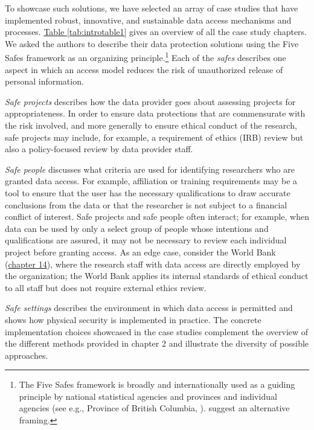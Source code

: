 To showcase such solutions, we have selected an array of case studies that have implemented robust, innovative, and sustainable data access mechanisms and processes. \href{https://drive.google.com/file/d/11QOJs0fXgLJp9W74SpWCti2_glpmonHC/view?usp=sharing}{Table \ref{tab:introtable1}} gives an overview of all the case study chapters. We asked the authors to describe their data protection solutions using the Five Safes framework \citep{desai2016} as an organizing principle.\footnote{The Five Safes framework is broadly and internationally used as a guiding principle by national statistical agencies \citep{australianbureauofstatistics2017, statisticscanada2018} and provinces and individual agencies (see e.g., Province of British Columbia, \citet{bcministryofcitizensservices}). \citet{altman2015} suggest an alternative framing.} Each of the \emph{safes} describes one aspect in which an access model reduces the risk of unauthorized release of personal information.



\emph{Safe projects} describes how the data provider goes about assessing projects for appropriateness. In order to ensure data protections that are commensurate with the risk involved, and more generally to ensure ethical conduct of the research, safe projects may include, for example, a requirement of ethics (IRB) review but also a policy-focused review by data provider staff.

\emph{Safe people} discusses what criteria are used for identifying researchers who are granted data access. For example, affiliation or training requirements may be a tool to ensure that the user has the necessary qualifications to draw accurate conclusions from the data or that the researcher is not subject to a financial conflict of interest. Safe projects and safe people often interact; for example, when data can be used by only a select group of people whose intentions and qualifications are assured, it may not be necessary to review each individual project before granting access. As an edge case, consider the World Bank (\protect\hyperlink{dime}{chapter 14}), where the research staff with data access are directly employed by the organization; the World Bank applies its internal standards of ethical conduct to all staff but does not require external ethics review.

\emph{Safe settings} describes the environment in which data access is permitted and shows how physical security is implemented in practice. The concrete implementation choices showcased in the case studies complement the overview of the different methods provided in chapter 2 and illustrate the diversity of possible approaches.

